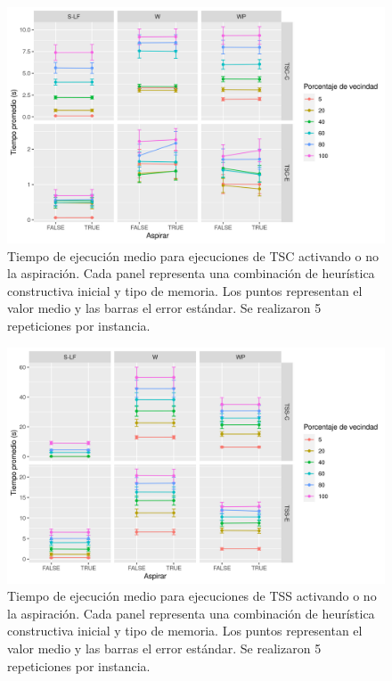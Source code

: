 \begin{figure}[H]
    \centering
    \includegraphics[scale = 0.7]{plots/suplementarias/aspirar_tiempo_tsc.png}
    \caption{Tiempo de ejecución medio para ejecuciones de TSC activando o no la aspiración. Cada panel representa una combinación de heurística constructiva inicial y tipo de memoria. Los puntos representan el valor medio y las barras el error estándar. Se realizaron 5 repeticiones por instancia.}
    \label{plot:aspirar tiempo tsc}
\end{figure}

\begin{figure}[H]
    \centering
    \includegraphics[scale = 0.7]{plots/suplementarias/aspirar_tiempo_tss.png}
    \caption{Tiempo de ejecución medio para ejecuciones de TSS activando o no la aspiración. Cada panel representa una combinación de heurística constructiva inicial y tipo de memoria. Los puntos representan el valor medio y las barras el error estándar. Se realizaron 5 repeticiones por instancia.}
    \label{plot:aspirar tiempo tss}
\end{figure}

